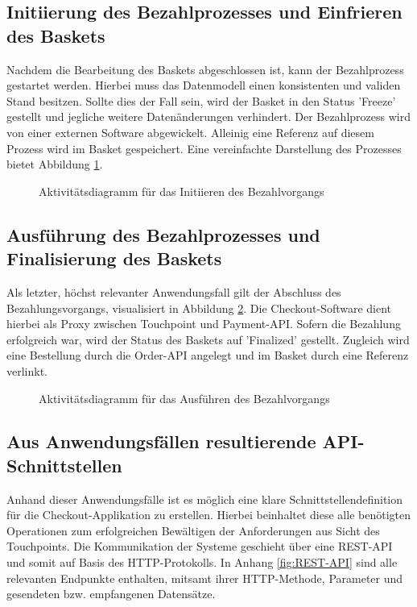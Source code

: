 \subsection{Initiierung des Bezahlprozesses und Einfrieren des Baskets}

Nachdem die Bearbeitung des Baskets abgeschlossen ist, kann der Bezahlprozess gestartet werden. Hierbei muss das Datenmodell einen konsistenten und validen Stand besitzen. Sollte dies der Fall sein, wird der Basket in den Status 'Freeze' gestellt und jegliche weitere Datenänderungen verhindert. Der Bezahlprozess wird von einer externen Software abgewickelt. Alleinig eine Referenz auf diesem Prozess wird im Basket gespeichert. Eine vereinfachte Darstellung des Prozesses bietet Abbildung \ref{fig:SL-InitPayment}.

\begin{figure}[h!]
	\centering
	
	\caption{Aktivitätsdiagramm für das Initiieren des Bezahlvorgangs }
	\label{fig:SL-InitPayment}
\end{figure}

\subsection{Ausführung des Bezahlprozesses und Finalisierung des Baskets}

Als letzter, höchst relevanter Anwendungsfall gilt der Abschluss des Bezahlungsvorgangs, visualisiert in Abbildung \ref{fig:SL-ExecPayment}. Die Checkout-Software dient hierbei als Proxy zwischen Touchpoint und Payment-API. Sofern die Bezahlung erfolgreich war, wird der Status des Baskets auf 'Finalized' gestellt. Zugleich wird eine Bestellung durch die Order-API angelegt und im Basket durch eine Referenz verlinkt.

\begin{figure}[h!]
	\centering
	
	\caption{Aktivitätsdiagramm für das Ausführen des Bezahlvorgangs }
	\label{fig:SL-ExecPayment}
\end{figure}

\subsection{Aus Anwendungsfällen resultierende API-Schnittstellen }

Anhand dieser Anwendungsfälle ist es möglich eine klare Schnittstellendefinition für die Checkout-Applikation zu erstellen. Hierbei beinhaltet diese alle benötigten Operationen zum erfolgreichen Bewältigen der Anforderungen aus Sicht des Touchpoints. Die Kommunikation der Systeme geschieht über eine \acrshort{REST}-API und somit auf Basis des \acrshort{HTTP}-Protokolls. In Anhang \ref{fig:REST-API} sind alle relevanten Endpunkte enthalten, mitsamt ihrer HTTP-Methode, Parameter und gesendeten bzw. empfangenen Datensätze.

